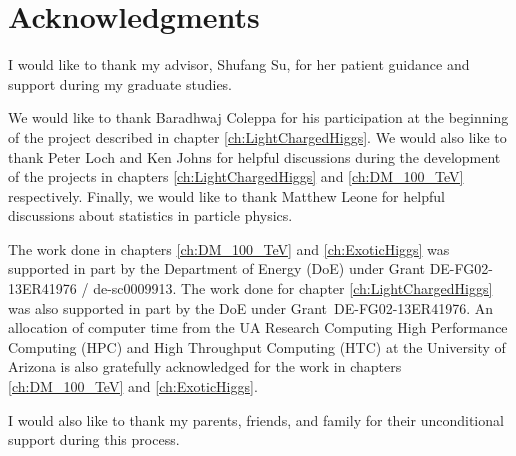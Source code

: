 \chapter*{Acknowledgments}

I would like to thank my advisor, Shufang Su, for her patient guidance and support during my graduate studies.

We would like to thank Baradhwaj Coleppa for his participation at the beginning of the project described in chapter \ref{ch:LightChargedHiggs}. We would also like to thank  Peter Loch and Ken Johns for helpful discussions during the development of the projects in chapters \ref{ch:LightChargedHiggs} and \ref{ch:DM_100_TeV} respectively. Finally, we would like to thank Matthew Leone for helpful discussions about statistics in particle physics.

The work done in chapters \ref{ch:DM_100_TeV} and \ref{ch:ExoticHiggs} was supported in part by the Department of Energy (DoE) under Grant DE-FG02-13ER41976 / de-sc0009913. The work done for chapter \ref{ch:LightChargedHiggs} was also supported in part by the DoE under Grant~DE-FG02-13ER41976. An allocation of computer time from the UA Research Computing High Performance Computing (HPC) and High Throughput Computing (HTC) at the University of Arizona is also gratefully acknowledged for the work in chapters \ref{ch:DM_100_TeV} and \ref{ch:ExoticHiggs}.

I would also like to thank my parents, friends, and family for their unconditional support during this process.
